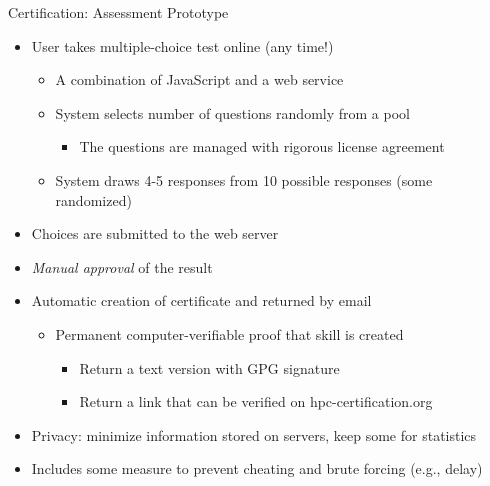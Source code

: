 \documentclass[compress,aspectratio=169]{beamer}
\begin{document}
\begin{frame}{Certification: Assessment Prototype}
		\begin{itemize}
			\item[\color{readingRed}{1.}] User takes multiple-choice test online (any time!)
			\begin{itemize}
				\item A combination of JavaScript and a web service
				\item System selects number of questions randomly from a pool
					\begin{itemize}
						\item The questions are managed with rigorous license agreement
					\end{itemize}
				\item System draws 4-5 responses from 10 possible responses (some randomized)
			\end{itemize}
			\item[\color{readingRed}{2.}] Choices are submitted to the web server
			\item[\color{readingRed}{3.}] \textit{Manual approval} of the result
			\item[\color{readingRed}{4.}] Automatic creation of certificate and returned by email
			\begin{itemize}
							\item Permanent computer-verifiable proof that skill is created
							\begin{itemize}
								\item Return a text version with GPG signature
								\item Return a link that can be verified on hpc-certification.org
							\end{itemize}
			\end{itemize}
			\item Privacy: minimize information stored on servers, keep some for statistics
			\item Includes some measure to prevent cheating and brute forcing (e.g., delay)
		\end{itemize}
\end{frame}
\end{document}
